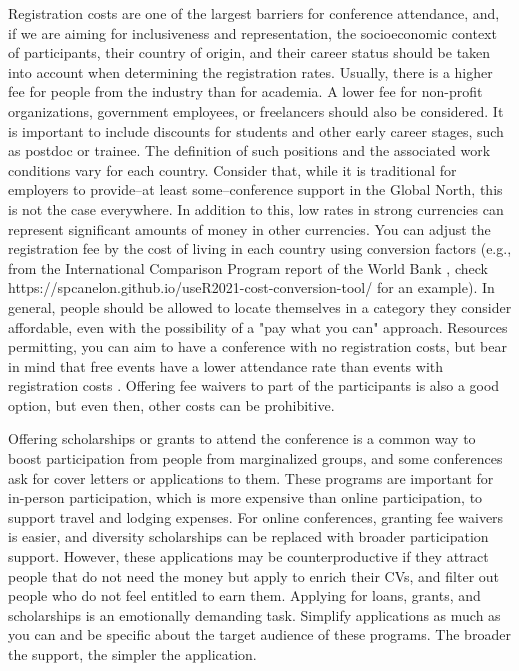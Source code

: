 \documentclass[10pt,letterpaper]{article}
\begin{document}
Registration costs are one of the largest barriers for conference attendance, and, if we are aiming for inclusiveness and representation, the socioeconomic context of participants, their country of origin, and their career status should be taken into account when determining the registration rates. Usually, there is a higher fee for people from the industry than for academia. A lower fee for non-profit organizations, government employees, or freelancers should also be considered. It is important to include discounts for students \cite{sarabipourChangingScientificMeetings2021, andalibPostdocQueueLabour2018, kaplanPostdocNot2012} and other early career stages, such as postdoc or trainee. The definition of such positions and the associated work conditions vary for each country. Consider that, while it is traditional for employers to provide--at least some--conference support in the Global North, this is not the case everywhere. In addition to this, low rates in strong currencies can represent significant amounts of money in other currencies. You can adjust the registration fee by the cost of living in each country using conversion factors (e.g., from the International Comparison Program report of the World Bank \cite{arendDisparityConferenceRegistration2019}, check https://spcanelon.github.io/useR2021-cost-conversion-tool/ for an example). In general, people should be allowed to locate themselves in a category they consider affordable, even with the possibility of a "pay what you can" approach. Resources permitting, you can aim to have a conference with no registration costs, but bear in mind that free events have a lower attendance rate than events with registration costs \cite{eventbrite_ultimate_2017}. Offering fee waivers to part of the participants is also a good option, but even then, other costs can be prohibitive. 

Offering scholarships or grants to attend the conference is a common way to boost participation from people from marginalized groups, and some conferences ask for cover letters or applications to them. These programs are important for in-person participation, which is more expensive than online participation, to support travel and lodging expenses. For online conferences, granting fee waivers is easier, and diversity scholarships can be replaced with broader participation support.
However, these applications may be counterproductive if they attract people that do not need the money but apply to enrich their CVs, and filter out people who do not feel entitled to earn them. Applying for loans, grants, and scholarships is an emotionally demanding task. Simplify applications as much as you can and be specific about the target audience of these programs. The broader the support, the simpler the application.
\end{document}
